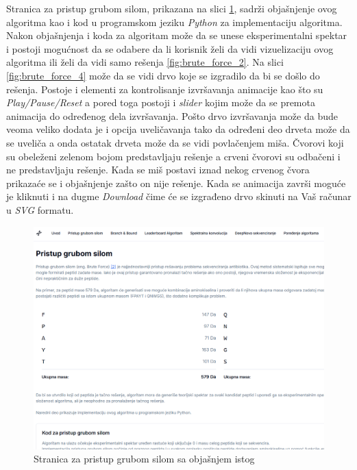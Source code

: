 \documentclass[12pt,oneside]{memoir}
\begin{document}
Stranica za pristup grubom silom, prikazana na slici \ref{fig:brute_force_1}, sadrži objašnjenje ovog algoritma kao i kod u programskom jeziku \emph{Python} za implementaciju algoritma.
Nakon objašnjenja i koda za algoritam može da se unese eksperimentalni spektar i postoji mogućnost da se odabere da li korisnik želi da vidi vizuelizaciju ovog algoritma ili želi da vidi samo rešenja \ref{fig:brute_force_2}. Na slici \ref{fig:brute_force_4} može da se vidi drvo koje se izgradilo da bi se došlo do rešenja. Postoje i elementi za kontrolisanje izvršavanja animacije kao što su \emph{Play/Pause/Reset} a pored toga postoji i \emph{slider} kojim može da se premota animacija do određenog dela izvršavanja. Pošto drvo izvršavanja može da bude veoma veliko dodata je i opcija uveličavanja tako da određeni deo drveta može da se uveliča a onda ostatak drveta može da se vidi povlačenjem miša. Čvorovi koji su obeleženi zelenom bojom predstavljaju rešenje a crveni čvorovi su odbačeni i ne predstavljaju rešenje. Kada se miš postavi iznad nekog crvenog čvora prikazaće se i objašnjenje zašto on nije rešenje.
Kada se animacija završi moguće je kliknuti i na dugme \emph{Download} čime će se izgrađeno drvo skinuti na Vaš računar u \emph{SVG} formatu.
\begin{figure}[h]
\centering
\includegraphics[width=1\textwidth]{images/brute_force_1.png}
\caption{Stranica za pristup grubom silom sa objašnjem istog}
\label{fig:brute_force_1}
\end{figure}
\end{document}
